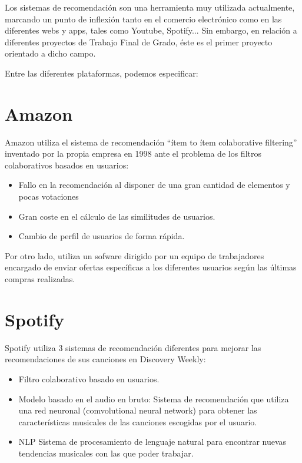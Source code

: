 Los sistemas de recomendación son una herramienta muy utilizada actualmente, marcando un punto de inflexión tanto  en el comercio electrónico   como  en las diferentes webs y apps, tales como Youtube, Spotify... 
Sin embargo, en relación a diferentes proyectos de Trabajo Final de Grado, éste es el primer proyecto orientado a dicho campo. 

Entre las diferentes plataformas, podemos especificar:

\section{Amazon}
Amazon utiliza el sistema de recomendación ``ítem to ítem colaborative filtering'' inventado por la propia empresa en 1998 ante el problema de los filtros colaborativos basados en usuarios:
\begin{itemize}
\item Fallo en la recomendación al disponer de una gran cantidad de elementos y pocas votaciones
\item Gran coste en el cálculo de las similitudes de usuarios. 
\item Cambio de perfil de usuarios de forma rápida.\nocite{wiki:filter}
\end{itemize}
Por otro lado, utiliza un sofware dirigido por un equipo de trabajadores encargado de enviar ofertas específicas a los diferentes usuarios según las últimas compras realizadas.\nocite{manu:amazon}
\section{Spotify}
Spotify  utiliza 3 sistemas de recomendación diferentes para mejorar las recomendaciones de sus canciones en Discovery Weekly: 
\begin{itemize}
\item Filtro colaborativo basado en usuarios. 
\item Modelo basado en el audio en bruto: Sistema de recomendación que utiliza una red neuronal (comvolutional neural network) para obtener las características musicales de las canciones escogidas por el usuario. 
\item NLP Sistema de procesamiento de lenguaje natural para encontrar nuevas tendencias musicales con las que poder trabajar. \cite{isaac:spotify}
\end{itemize}



